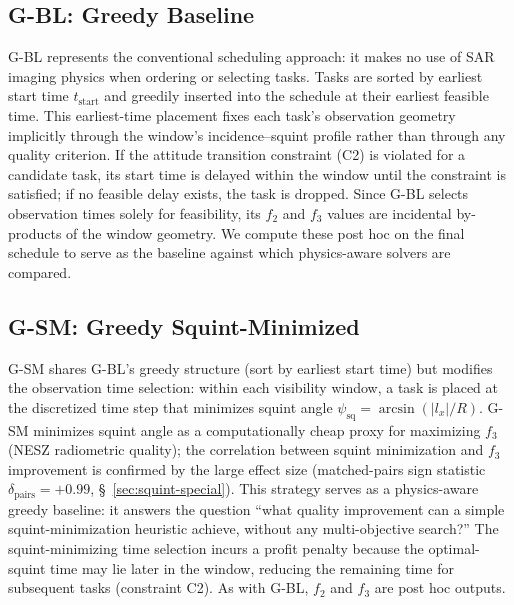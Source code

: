 \documentclass[preprint,12pt,authoryear]{elsarticle}
\begin{document}
\subsection{G-BL: Greedy Baseline}
\label{sec:gbl}
G-BL represents the conventional scheduling approach:
it makes no use of SAR imaging physics when ordering or selecting tasks.
Tasks are sorted by earliest start time $t_{\text{start}}$ and greedily inserted
into the schedule at their earliest feasible time.
This earliest-time placement fixes each task's observation geometry implicitly
through the window's incidence--squint profile rather than through any quality
criterion.
If the attitude transition constraint (C2) is violated for a candidate task,
its start time is delayed within the window until the constraint is satisfied;
if no feasible delay exists, the task is dropped.
Since G-BL selects observation times solely for feasibility, its $f_2$ and
$f_3$ values are incidental by-products of the window geometry.
We compute these post hoc on the final schedule to serve as the baseline
against which physics-aware solvers are compared.
\subsection{G-SM: Greedy Squint-Minimized}
G-SM shares G-BL's greedy structure (sort by earliest start time) but modifies the
observation time selection: within each visibility window, a task is
placed at the discretized time step that minimizes squint angle
$\psi_{\text{sq}} = \arcsin(|l_x| / R)$.
G-SM minimizes squint angle as a computationally cheap proxy for
maximizing $f_3$ (NESZ radiometric quality); the correlation between
squint minimization and $f_3$ improvement is confirmed by the large
effect size (matched-pairs sign statistic $\delta_{\text{pairs}} = +0.99$, \S~\ref{sec:squint-special}).
This strategy serves as a physics-aware greedy baseline: it answers the question
``what quality improvement can a simple squint-minimization heuristic
achieve, without any multi-objective search?''
The squint-minimizing time selection incurs a profit penalty because
the optimal-squint time may lie later in the window, reducing the
remaining time for subsequent tasks (constraint C2).
As with G-BL, $f_2$ and $f_3$ are post hoc outputs.
\end{document}

